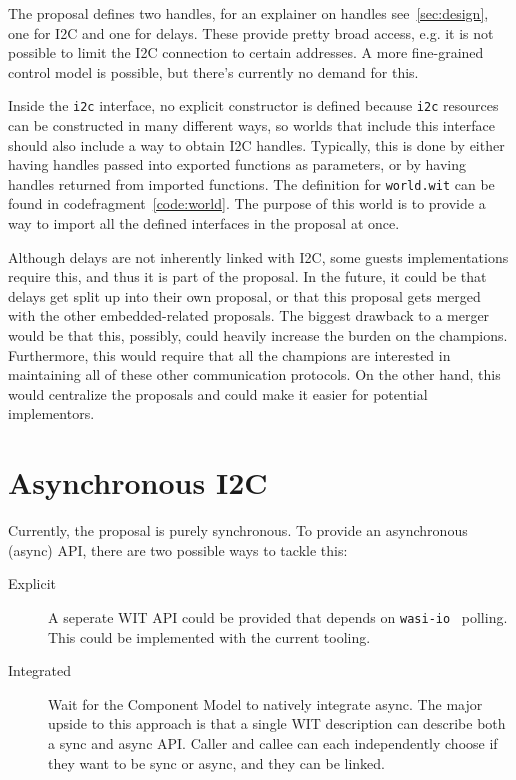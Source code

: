 The proposal defines two handles, for an explainer on handles see~\ref{sec:design}, one for \gls{I2C} and one for delays. These provide pretty broad access, e.g. it is not possible to limit the \gls{I2C} connection to certain addresses. A more fine-grained control model is possible, but there's currently no demand for this.

Inside the \texttt{i2c} interface, no explicit constructor is defined because \texttt{i2c} resources can be constructed in many different ways, so worlds that include this interface should also include a way to obtain \gls{I2C} handles. Typically, this is done by either having handles passed into exported functions as parameters, or by having handles returned from imported functions.
The definition for \texttt{world.wit} can be found in codefragment~\ref{code:world}. The purpose of this world is to provide a way to import all the defined interfaces in the proposal at once.

Although delays are not inherently linked with \gls{I2C}, some guests implementations require this, and thus it is part of the proposal. In the future, it could be that delays get split up into their own proposal, or that this proposal gets merged with the other embedded-related proposals. The biggest drawback to a merger would be that this, possibly, could heavily increase the burden on the champions. Furthermore, this would require that all the champions are interested in maintaining all of these other communication protocols. On the other hand, this would centralize the proposals and could make it easier for potential implementors.

\section{Asynchronous I2C}

Currently, the proposal is purely synchronous. To provide an asynchronous (async) API, there are two possible ways to tackle this:

\begin{description}
    \item[Explicit] A seperate WIT API could be provided that depends on \texttt{wasi-io}~\cite{gh:io} polling. This could be implemented with the current tooling.
    \item[Integrated] Wait for the Component Model to natively integrate async. The major upside to this approach is that a single WIT description can describe both a sync and async API. Caller and callee can each independently choose if they want to be sync or async, and they can be linked.
\end{description}

